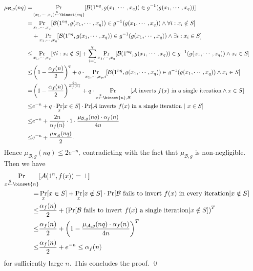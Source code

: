 \documentclass[12pt]{tufte-book}
\begin{document}
\begin{align*}
\mu_{\mathcal{B},g}(nq) =& \Pr_{(x_1, \cdots, x_q) \stackrel{\$}{\leftarrow} \binset{nq}}[ \mathcal{B}(1^{nq}, g(x_1, \cdots, x_q)) \in g^{-1}(g(x_1, \cdots, x_q))]\\
=&  \Pr_{x_1, \cdots, x_q}[ \mathcal{B}(1^{nq}, g(x_1, \cdots, x_q)) \in g^{-1}(g(x_1, \cdots, x_q)) \wedge \forall i: x_i \notin S]\\
& + \Pr_{x_1, \cdots, x_q}[ \mathcal{B}(1^{nq}, g(x_1, \cdots, x_q)) \in g^{-1}(g(x_1, \cdots, x_q)) \wedge \exists i: x_i \in S]\\
\leq& \Pr_{x_1, \cdots, x_q}[ \forall i: x_i \notin S]
+ \sum_{i=1}^q \Pr_{x_1, \cdots, x_q}[ \mathcal{B}(1^{nq}, g(x_1, \cdots, x_q)) \in g^{-1}(g(x_1, \cdots, x_q)) \wedge  x_i \in S]\\
\leq& \left( 1-\frac{\alpha_f(n)}{2}\right)^q
+ q \cdot \Pr_{x_1, \cdots, x_q,i}[ \mathcal{B}(1^{nq}, g(x_1, \cdots, x_q)) \in g^{-1}(g(x_1, \cdots, x_q)) \wedge x_i \in S] \\
=& \left( 1-\frac{\alpha_f(n)}{2}\right)^{\frac{2n}{\alpha_f(n)}}
+  q\cdot \Pr_{x \stackrel{\$}{\leftarrow} \binset{n}, \mathcal{B}}[\mathcal{A} \text{ inverts $f(x)$ in a single iteration}  \wedge x \in S]\\
\leq& e^{-n} + q\cdot  \Pr_{x}[x \in S] \cdot \Pr[\mathcal{A} \text{ inverts $f(x)$ in a single iteration} ~|~ x \in S]\\
\leq& e^{-n} + \frac{2n}{\alpha_f(n)} \cdot  1 \cdot \frac{\mu_{\mathcal{B},g}(nq) \cdot \alpha_f(n)}{4n}\\
\leq& e^{-n} + \frac{\mu_{\mathcal{B},g}(nq)}{2}.
\end{align*}
Hence $\mu_{\mathcal{B},g}(nq) \leq 2 e^{-n}$, contradicting with the fact that $\mu_{\mathcal{B},g}$ is non-negligible.
Then we have
\begin{align*}
\Pr_{x \stackrel{\$}{\leftarrow} \binset{n}}&[ \mathcal{A}(1^n, f(x)) = \bot]\\
=& \Pr_x[x \in S] + \Pr_x [x \notin S]\cdot\Pr[\mathcal{B} \text{ fails to invert $f(x)$ in every iteration} | x \notin S]\\
\leq& \frac{\alpha_f(n)}{2}+ \left(\Pr[ \mathcal{B} \text{ fails to invert $f(x)$ a single iteration} | x \notin S] \right)^T\\
\leq & \frac{\alpha_f(n)}{2}+ \left( 1-\frac{\mu_{\mathcal{A},g}(nq) \cdot \alpha_f(n)}{4n}\right)^T\\
\leq& \frac{\alpha_f(n)}{2} + e^{-n} \leq \alpha_f(n)
\end{align*}
for sufficiently large $n$. This concludes the proof.
\qed
\end{document}
